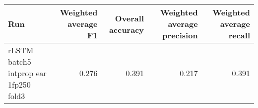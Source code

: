 \begin{tabular}{lrrrr}
\toprule
Run & Weighted average F1 & Overall accuracy & Weighted average precision & Weighted average recall \\
\midrule
rLSTM batch5 intprop ear 1fp250 fold3 & 0.276 & 0.391 & 0.217 & 0.391 \\
\bottomrule
\end{tabular}
